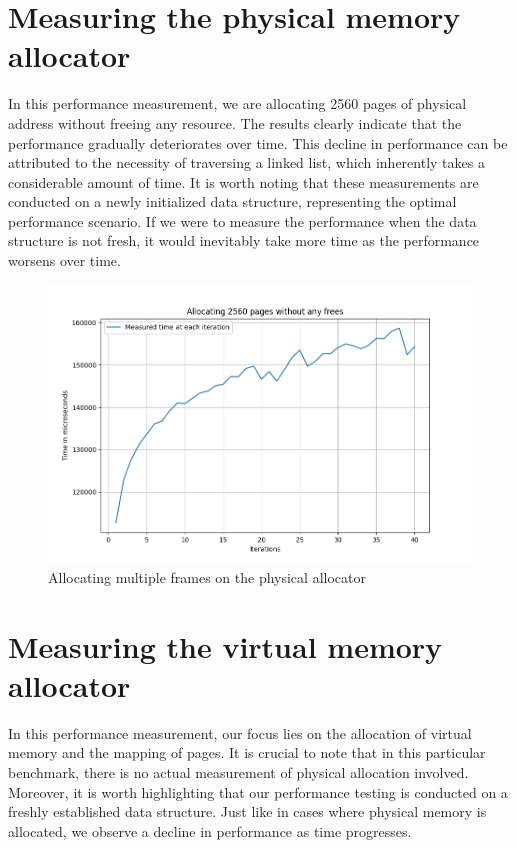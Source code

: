\section{Measuring the physical memory allocator}

In this performance measurement, we are allocating 2560 pages of physical address without freeing any resource. The results clearly indicate that the performance gradually deteriorates over time. This decline in performance can be attributed to the necessity of traversing a linked list, which inherently takes a considerable amount of time. It is worth noting that these measurements are conducted on a newly initialized data structure, representing the optimal performance scenario. If we were to measure the performance when the data structure is not fresh, it would inevitably take more time as the performance worsens over time.

\begin{figure}[htp]
    \centering
    \includegraphics[width=12cm]{images/benchmarks/physical_allocator.png}
    \caption{Allocating multiple frames on the physical allocator}
    \label{fig:galaxy}
\end{figure}

\section{Measuring the virtual memory allocator}

In this  performance measurement, our focus lies on the allocation of virtual memory and the mapping of pages. It is crucial to note that in this particular benchmark, there is no actual measurement of physical allocation involved. Moreover, it is worth highlighting that our performance testing is conducted on a freshly established data structure. Just like in cases where physical memory is allocated, we observe a decline in performance as time progresses.

